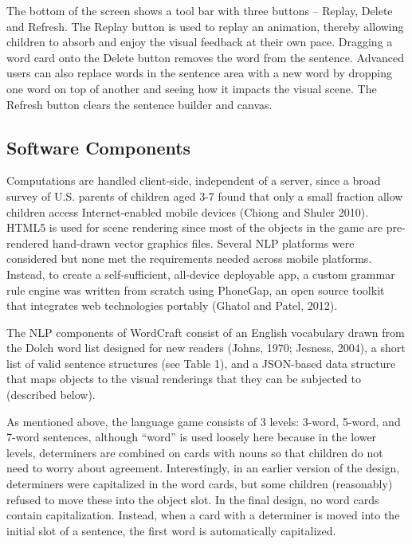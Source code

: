 \documentclass{sigchi-ext}
\begin{document}
The bottom of the screen shows a tool bar with three buttons – Replay, Delete and Refresh.  The Replay button is used to replay an animation, thereby allowing children to absorb and enjoy the visual feedback at their own pace. Dragging a word card onto the Delete button removes the word from the sentence. Advanced users can also replace words in the sentence area with a new word by dropping one word on top of another and seeing how it impacts the visual scene. The Refresh button clears the sentence builder and canvas.

\subsection{Software Components}
Computations are handled client-side, independent of a server, since a broad survey of U.S. parents of children aged 3-7 found that only a small fraction allow children access Internet-enabled mobile devices  (Chiong and Shuler 2010). HTML5 is used for scene rendering since most of the objects in the game are pre-rendered hand-drawn vector graphics files.  Several NLP platforms were considered but none met the requirements needed across mobile platforms.  Instead, to create a self-sufficient, all-device deployable app, a custom grammar rule engine was written from scratch using PhoneGap, an open source toolkit that integrates web technologies portably (Ghatol and Patel, 2012).

The NLP components of WordCraft consist of an English vocabulary drawn from the Dolch  word list designed for new readers (Johns, 1970; Jesness, 2004), a short list of valid sentence structures (see Table 1), and a JSON-based data structure that maps objects to the visual renderings that they can be subjected to (described below).

As mentioned above, the language game consists of 3 levels: 3-word, 5-word, and 7-word sentences, although “word” is used loosely here because in the lower levels, determiners are combined on cards with nouns so that children do not need to worry about agreement.  Interestingly, in an earlier version of the design, determiners were capitalized in the word cards, but some children (reasonably) refused to move these into the object slot.  In the final design, no word cards contain capitalization.  Instead, when a card with a determiner is moved into the initial slot of a sentence, the first word is automatically capitalized.
\end{document}
